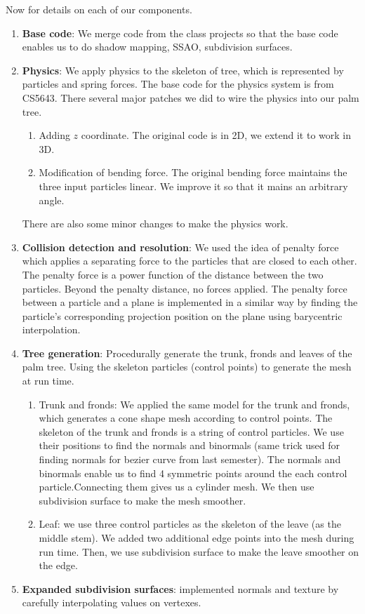 \documentclass[annual]{acmsiggraph}
\begin{document}
Now for details on each of our components.
\begin{enumerate}
\item{\textbf{Base code}: We merge code from the class projects  so that the base code enables us to do shadow mapping, SSAO, subdivision surfaces.}
\item{\textbf{Physics}: We apply physics to the skeleton of tree, which is represented by particles and spring forces. The base code for the physics system is from CS5643. There several major patches we did to wire the physics into our palm tree. 
\begin{enumerate}
\item{Adding $z$ coordinate. The original code is in 2D, we extend it to work in 3D.}
\item{Modification of bending force. The original bending force maintains the three input particles linear. We improve it so that it mains an arbitrary angle.}
\end{enumerate}
There are also some minor changes to make the physics work.}
\item{\textbf{Collision detection and resolution}: We used the idea of penalty force which applies a separating force to the particles that are closed to each other. The penalty force is a power function of the distance between the two particles. Beyond the penalty distance, no forces applied. The penalty force between a particle and a plane is implemented in a similar way by finding the particle's corresponding projection position on the plane using barycentric interpolation. }

\item{\textbf{Tree generation}: Procedurally generate the trunk, fronds and leaves of the palm tree. Using the skeleton particles (control points) to generate the mesh at run time. 
\begin{enumerate}
\item{Trunk and fronds: We applied the same model for the trunk and fronds, which generates a cone shape mesh according to control points. The skeleton of the trunk and fronds is a string of control particles. We use their positions to find the normals and binormals (same trick used for finding normals for bezier curve from last semester). The normals and binormals enable us to find 4 symmetric points around the each control particle.Connecting them gives us a cylinder mesh. We then use subdivision surface to make the mesh smoother.}
\item{Leaf: we use three control particles as the skeleton of the leave (as the middle stem). We added two additional edge points into the mesh during run time. Then, we use subdivision surface to make the leave smoother on the edge.}
\end{enumerate}
}
\item{\textbf{Expanded subdivision surfaces}: implemented normals and texture by carefully interpolating values on vertexes.}


\end{enumerate}
\end{document}

